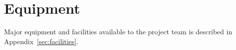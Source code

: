 \chapter{Equipment}
\label{sec:equipment}

%
%


Major equipment and facilities available to the project team is described in Appendix~\ref{sec:facilities}.







